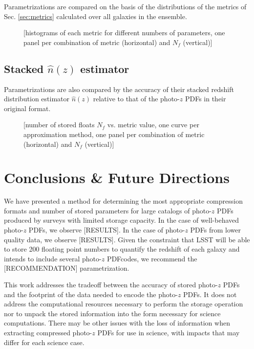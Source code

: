 \documentclass[\docopts]{\docclass}
\newcommand{\pz}{photo-$z$ PDF}
\begin{document}
Parametrizations are compared on the basis of the distributions of the metrics 
of Sec. \ref{sec:metrics} calculated over all galaxies in the ensemble.

\begin{figure}
  \caption{[histograms of each metric for different numbers of parameters, one 
panel per combination of metric (horizontal) and $N_{f}$ (vertical)]
  \label{fig:individual}}
\end{figure}

\subsection{Stacked $\hat{n}(z)$ estimator}
\label{sec:stacked}

Parametrizations are also compared by the accuracy of their stacked redshift 
distribution estimator $\hat{n}(z)$ relative to that of the \pz s in their 
original format.

\begin{figure}
  \caption{[number of stored floats $N_{f}$ vs. metric value, one curve per 
approximation method, one panel per combination of metric (horizontal) and 
$N_{f}$ (vertical)]
  \label{fig:stacked}}
\end{figure}





\section{Conclusions \& Future Directions}
\label{sec:conclusions}

We have presented a method for determining the most appropriate compression 
formats and number of stored parameters for large catalogs of \pz s produced by 
surveys with limited storage capacity.   In the case of well-behaved \pz s, we 
observe [RESULTS].  In the case of \pz s from lower quality data, we observe 
[RESULTS].  Given the constraint that LSST will be able to store 200 floating 
point numbers to quantify the redshift of each galaxy and intends to include 
several \pz  codes, we recommend the [RECOMMENDATION] parametrization.



This work addresses the tradeoff between the accuracy of stored \pz s and the 
footprint of the data needed to encode the \pz s.  It does not address the 
computational resources necessary to perform the storage operation nor to 
unpack the stored information into the form necessary for science computations. 
 There may be other issues with the loss of information when extracting 
compressed \pz s for use in science, with impacts that may differ for each 
science case.
\end{document}
